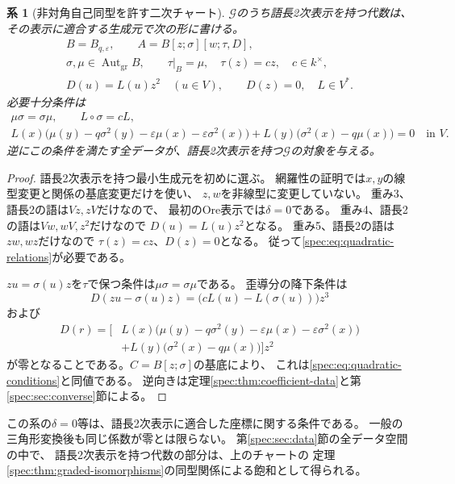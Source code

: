 \documentclass[11pt,a4paper]{ltjsarticle}
\newtheorem{corollary}[theorem]{系}
\theoremstyle{definition}
\newcommand{\Aut}{\operatorname{Aut}}
\newcommand{\Gclass}{\mathcal G}
\begin{document}
\begin{corollary}[非対角自己同型を許す二次チャート]\label{spec:cor:quadratic-chart}
$\Gclass$のうち語長2次表示を持つ代数は、
その表示に適合する生成元で次の形に書ける。
\begin{equation}\label{spec:eq:quadratic-relations}
\begin{gathered}
B=B_{q,\varepsilon},\qquad
A=B[z;\sigma][w;\tau,D],\\
\sigma,\mu\in\Aut_{\mathrm{gr}}B,\qquad
\tau|_B=\mu,\quad \tau(z)=cz,\quad c\in k^\times,\\
D(u)=L(u)z^2\quad(u\in V),\qquad D(z)=0,\quad L\in V^*.
\end{gathered}
\end{equation}
必要十分条件は
\begin{equation}\label{spec:eq:quadratic-conditions}
\begin{gathered}
\mu\sigma=\sigma\mu,\qquad L\circ\sigma=cL,\\
L(x)\bigl(\mu(y)-q\sigma^2(y)
-\varepsilon\mu(x)-\varepsilon\sigma^2(x)\bigr)
+L(y)\bigl(\sigma^2(x)-q\mu(x)\bigr)=0
\quad\text{in }V.
\end{gathered}
\end{equation}
逆にこの条件を満たす全データが、語長2次表示を持つ$\Gclass$の対象を与える。
\end{corollary}
\begin{proof}
語長2次表示を持つ最小生成元を初めに選ぶ。
網羅性の証明では$x,y$の線型変更と関係の基底変更だけを使い、
$z,w$を非線型に変更していない。
重み3、語長2の語は$Vz,zV$だけなので、
最初のOre表示では$\delta=0$である。
重み4、語長2の語は$Vw,wV,z^2$だけなので
$D(u)=L(u)z^2$となる。
重み5、語長2の語は$zw,wz$だけなので
$\tau(z)=cz$、$D(z)=0$となる。
従って\eqref{spec:eq:quadratic-relations}が必要である。

$zu=\sigma(u)z$を$\tau$で保つ条件は$\mu\sigma=\sigma\mu$である。
歪導分の降下条件は
\[
D(zu-\sigma(u)z)=
\bigl(cL(u)-L(\sigma(u))\bigr)z^3
\]
および
\[
\begin{split}
D(r)=\bigl[
&L(x)\bigl(\mu(y)-q\sigma^2(y)
-\varepsilon\mu(x)-\varepsilon\sigma^2(x)\bigr)\\
&+L(y)\bigl(\sigma^2(x)-q\mu(x)\bigr)\bigr]z^2
\end{split}
\]
が零となることである。$C=B[z;\sigma]$の基底により、
これは\eqref{spec:eq:quadratic-conditions}と同値である。
逆向きは定理\ref{spec:thm:coefficient-data}と第\ref{spec:sec:converse}節による。
\end{proof}

この系の$\delta=0$等は、語長2次表示に適合した座標に関する条件である。
一般の三角形変換後も同じ係数が零とは限らない。
第\ref{spec:sec:data}節の全データ空間の中で、
語長2次表示を持つ代数の部分は、上のチャートの
定理\ref{spec:thm:graded-isomorphisms}の同型関係による飽和として得られる。
\end{document}
